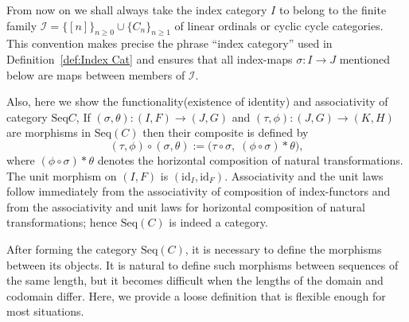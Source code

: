 \documentclass[11pt]{book}
\theoremstyle{definition}
\theoremstyle{plain}
\theoremstyle{remark}
\begin{document}
From now on we shall always take the index category \(I\) to belong to the finite family
\(\mathcal{I}=\{[n]\}_{n\ge0}\cup\{C_n\}_{n\ge1}\) of linear ordinals or cyclic cycle categories.
This convention makes precise the phrase ``index category'' used in Definition~\ref{def:Index Cat} and ensures that all
index-maps \(\sigma:I\to J\) mentioned below are maps between members of \(\mathcal I\).

Also, here we show the functionality(existence of identity) and associativity of category \(\mathrm{Seq}{C}\), 
If \((\sigma,\theta):(I,F)\to(J,G)\) and
\((\tau,\phi):(J,G)\to(K,H)\) are morphisms in \(\mathrm{Seq}(C)\) then their composite is
defined by
\[
(\tau,\phi)\circ(\sigma,\theta):=\bigl(\tau\circ\sigma,\;(\phi\circ\sigma)\ast\theta\bigr),
\]
where \((\phi\circ\sigma)\ast\theta\) denotes the horizontal composition of natural
transformations.  The unit morphism on \((I,F)\) is \((\mathrm{id}_I,\mathrm{id}_F)\).
Associativity and the unit laws follow immediately from the associativity of composition of
index-functors and from the associativity and unit laws for horizontal composition of natural
transformations; hence \(\mathrm{Seq}(C)\) is indeed a category.

\medskip
After forming the category \(\mathrm{Seq}(C)\), it is necessary to define the morphisms between 
its objects. It is natural to define such morphisms between sequences of the same length, but it 
becomes difficult when the lengths of the domain and codomain differ. Here, we provide a loose 
definition that is flexible enough for most situations.
\end{document}
